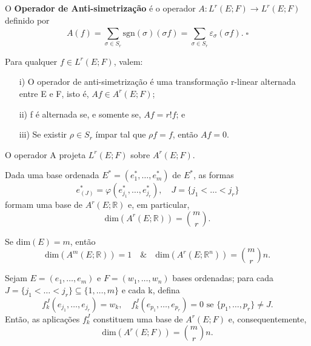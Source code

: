 \documentclass[../differential_forms.tex]{subfiles}
\begin{document}
\begin{def*}
	O \textbf{Operador de Anti-simetrização} é o operador \(A:L^{r}(E; F)\rightarrow L^{r}(E; F)\) definido por
	\[
		A(f)= \sum\limits_{\sigma \in S_r}^{} \mathrm{sgn}(\sigma )(\sigma f) = \sum\limits_{\sigma \in S_r}^{}\varepsilon_{\sigma }(\sigma f). \; \square
	\]
\end{def*}
\begin{prop*}
	Para qualquer \(f\in L^{r}(E; F)\), valem:
	\begin{itemize}
		\item[i)] O operador de anti-simetrização é uma transformação r-linear alternada entre E e F, isto é, \(Af\in A^{r}(E; F)\);
		\item[ii)] f é alternada se, e somente se, \(Af=r!f\); e
		\item[iii)] Se existir \(\rho \in S_r\) ímpar tal que \(\rho f = f\), então \(Af=0\).
	\end{itemize}
\end{prop*}
\begin{crl*}
	O operador A projeta \(L^{r}(E; F)\) sobre \(A^{r}(E; F)\).
\end{crl*}
\begin{prop*}
	Dada uma base ordenada \(E^{*}=(e_{1}^{*}, \dotsc , e_{m}^{*})\) de \(E^{*}\), as formas
	\[
		e_{(J)}^{*}=\varphi (e_{j_1}^{*}, \dotsc , e_{j_r}^{*}), \quad J = \{j_1<\dotsc <j_r\}
	\]
	formam uma base de \(A^{r}(E; \mathbb{R})\) e, em particular,
	\[
		\mathrm{dim}(A^{r}(E; \mathbb{R}))= \binom{m}{r}.
	\]
\end{prop*}
\begin{crl*}
	Se \(\mathrm{dim}(E) = m\), então
	\[
		\mathrm{dim}(A^{m}(E; \mathbb{R}))=1 \quad\&\quad \mathrm{dim}(A^{r}(E; \mathbb{R}^{n}))= \binom{m}{r}n.
	\]
\end{crl*}
\begin{prop*}
	Sejam \(E=(e_1,\dotsc ,e_{m})\) e \(F=(w_1,\dotsc ,w_{n})\) bases ordenadas; para cada \(J=\{j_1<\dotsc <j_r\}\subseteq \{1,\dotsc ,m\}\) e cada k, defina
	\[
		f_{k}^{J}(e_{j_1}, \dotsc , e_{j_r}) = w_{k}, \quad f_{k}^{J}(e_{p_1}, \dotsc , e_{p_r})=0 \text{ se }\{p_1,\dotsc , p_r\}\neq J.
	\]
	Então, as aplicações \(f_{k}^{J}\) constituem uma base de \(A^{r}(E; F)\) e, consequentemente,
	\[
		\mathrm{dim}(A^{r}(E; F))=\binom{m}{r}n.
	\]
\end{prop*}
\end{document}
